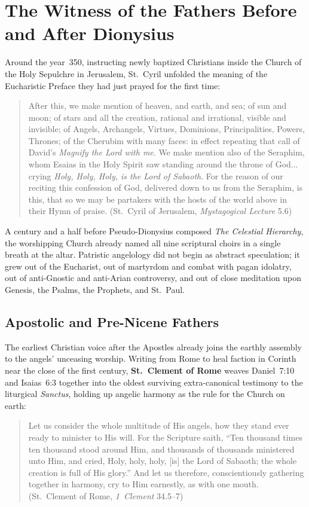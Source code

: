\section{The Witness of the Fathers Before and After Dionysius}
\label{sec:patristic-witness}

Around the year~350, instructing newly baptized Christians inside the Church of the Holy Sepulchre in Jerusalem, St.~Cyril unfolded the meaning of the Eucharistic Preface they had just prayed for the first time:
\begin{quotation}
After this, we make mention of heaven, and earth, and sea; of sun and moon; of stars and all the creation, rational and irrational, visible and invisible; of Angels, Archangels, Virtues, Dominions, Principalities, Powers, Thrones; of the Cherubim with many faces: in effect repeating that call of David's \emph{Magnify the Lord with me}. We make mention also of the Seraphim, whom Esaias in the Holy Spirit saw standing around the throne of God... crying \emph{Holy, Holy, Holy, is the Lord of Sabaoth}. For the reason of our reciting this confession of God, delivered down to us from the Seraphim, is this, that so we may be partakers with the hosts of the world above in their Hymn of praise. (St.~Cyril of Jerusalem, \emph{Mystagogical Lecture} 5.6)
\end{quotation}
A century and a half before Pseudo-Dionysius composed \emph{The Celestial Hierarchy}, the worshipping Church already named all nine scriptural choirs in a single breath at the altar. Patristic angelology did not begin as abstract speculation; it grew out of the Eucharist, out of martyrdom and combat with pagan idolatry, out of anti-Gnostic and anti-Arian controversy, and out of close meditation upon Genesis, the Psalms, the Prophets, and St.~Paul.

\subsection{Apostolic and Pre-Nicene Fathers}
\label{subsec:pre-nicene-fathers}

The earliest Christian voice after the Apostles already joins the earthly assembly to the angels' unceasing worship. Writing from Rome to heal faction in Corinth near the close of the first century, \textbf{St.~Clement of Rome} weaves Daniel~7:10 and Isaias~6:3 together into the oldest surviving extra-canonical testimony to the liturgical \emph{Sanctus}, holding up angelic harmony as the rule for the Church on earth:
\begin{quotation}
Let us consider the whole multitude of His angels, how they stand ever ready to minister to His will. For the Scripture saith, ``Ten thousand times ten thousand stood around Him, and thousands of thousands ministered unto Him, and cried, Holy, holy, holy, [is] the Lord of Sabaoth; the whole creation is full of His glory.'' And let us therefore, conscientiously gathering together in harmony, cry to Him earnestly, as with one mouth. (St.~Clement of Rome, \emph{1~Clement} 34.5--7)
\end{quotation}

